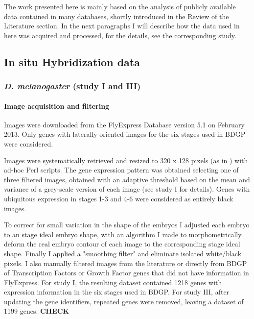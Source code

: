 The work presented here is mainly based on the analysis of publicly available data contained in many databases, shortly introduced in the Review of the Literature section. In the next paragraphs I will describe how the data used in here was acquired and processed, for the details, see the corresponding study.

\subsection{In situ Hybridization data}

\subsubsection{\textit{D. melanogaster} (study I and III)}

\paragraph{Image acquisition and filtering}

Images were downloaded from the FlyExpress Database version 5.1 \citep{Kumar2011} on February 2013. Only genes with laterally oriented images for the six stages used in BDGP \citep{Tomancak2002} were considered.

Images were systematically retrieved and resized to 320 x 128 pixels (as in \citealp{Konikoff2012}) with ad-hoc Perl scripts. 
The gene expression pattern was obtained selecting one of three filtered images, obtained with an adaptive threshold based on the mean and variance of a grey-scale version of each image (see study I for details). Genes with ubiquitous expression in stages 1-3 and 4-6 were considered as entirely black images.

To correct for small variation in the shape of the embryos I adjusted each embryo to an stage ideal embryo shape, with an algorithm I made to morphometrically deform the real embryo contour of each image to the corresponding stage ideal shape.
Finally I applied a "smoothing filter" and eliminate isolated white/black pixels. 
I also manually filtered images from the literature or directly from BDGP of Transcription Factors or Growth Factor genes that did not have information in FlyExpress. 
For study I, the resulting dataset contained 1218 genes with expression information in the six stages used in BDGP. For study III, after updating the gene identifiers, repeated genes were removed, leaving a dataset of 1199 genes. \textbf{CHECK}


